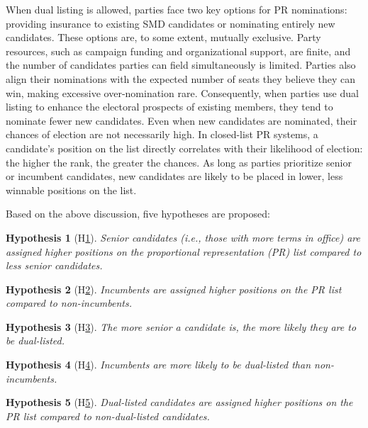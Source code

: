 \documentclass[a4paper, 11pt]{article}
\newtheorem{hyp}{Hypothesis}
\begin{document}
When dual listing is allowed, parties face two key options for PR nominations: providing insurance to existing SMD candidates or nominating entirely new candidates. These options are, to some extent, mutually exclusive. Party resources, such as campaign funding and organizational support, are finite, and the number of candidates parties can field simultaneously is limited. Parties also align their nominations with the expected number of seats they believe they can win, making excessive over-nomination rare. Consequently, when parties use dual listing to enhance the electoral prospects of existing members, they tend to nominate fewer new candidates. Even when new candidates are nominated, their chances of election are not necessarily high. In closed-list PR systems, a candidate’s position on the list directly correlates with their likelihood of election: the higher the rank, the greater the chances. As long as parties prioritize senior or incumbent candidates, new candidates are likely to be placed in lower, less winnable positions on the list.

Based on the above discussion, five hypotheses are proposed: 

\begin{hyp}[H\ref{hyp:first}] \label{hyp:first}
Senior candidates (i.e., those with more terms in office) are assigned higher positions on the proportional representation (PR) list compared to less senior candidates.
\end{hyp}

\begin{hyp}[H\ref{hyp:second}] \label{hyp:second}
Incumbents are assigned higher positions on the PR list compared to non-incumbents.
\end{hyp}

\begin{hyp}[H\ref{hyp:third}] \label{hyp:third}
The more senior a candidate is, the more likely they are to be dual-listed.
\end{hyp}

\begin{hyp}[H\ref{hyp:fourth}] \label{hyp:fourth}
Incumbents are more likely to be dual-listed than non-incumbents.
\end{hyp}

\begin{hyp}[H\ref{hyp:fifth}] \label{hyp:fifth}
Dual-listed candidates are assigned higher positions on the PR list compared to non-dual-listed candidates.
\end{hyp}
\end{document}
